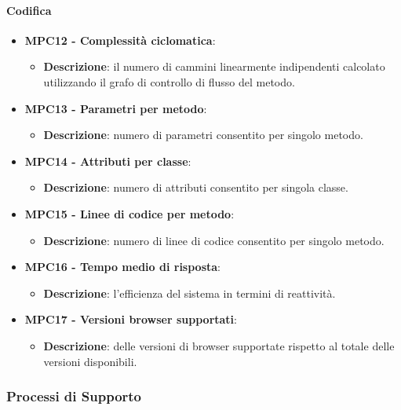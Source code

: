 \documentclass[10pt]{article}
\begin{document}
\begin{justify}
\paragraph{Codifica}
\begin{itemize}
    \item \textbf{MPC12 - Complessità ciclomatica}:
        \begin{itemize}
            \item \textbf{Descrizione}: il numero di cammini linearmente indipendenti calcolato utilizzando il grafo di controllo di flusso del metodo.
        \end{itemize}
    \item \textbf{MPC13 - Parametri per metodo}:
        \begin{itemize}
            \item \textbf{Descrizione}: numero di parametri consentito per singolo metodo.
        \end{itemize}
    \item \textbf{MPC14 - Attributi per classe}:
        \begin{itemize}
            \item \textbf{Descrizione}: numero di attributi consentito per singola classe.
        \end{itemize}
    \item \textbf{MPC15 - Linee di codice per metodo}:
        \begin{itemize}
            \item \textbf{Descrizione}: numero di linee di codice consentito per singolo metodo.
        \end{itemize}
    \item \textbf{MPC16 - Tempo medio di risposta}:
        \begin{itemize}
            \item \textbf{Descrizione}: l'efficienza del sistema in termini di reattività.
        \end{itemize}
    \item \textbf{MPC17 - Versioni browser supportati}:
        \begin{itemize}
            \item \textbf{Descrizione}: delle versioni di browser supportate rispetto al totale delle versioni disponibili.
        \end{itemize}
\end{itemize}

\subsubsection{Processi di Supporto}

\end{justify}
\end{document}
